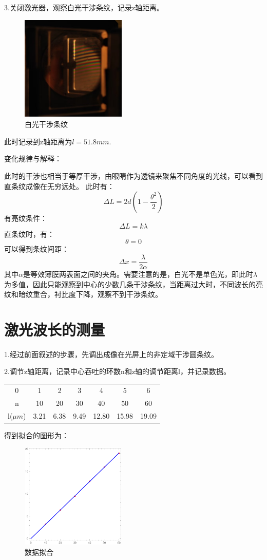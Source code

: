 \documentclass[a4paper, 10pt]{article}
\begin{document}
\noindent 3.关闭激光器，观察白光干涉条纹，记录z轴距离。

\begin{figure}[h]
  \centering 
  \includegraphics[height=5.0cm,width=5.0cm]{p7.png}
  
  \caption{白光干涉条纹}
  \label{8}

\end{figure}

\noindent 此时记录到z轴距离为$l=51.8mm$.

\noindent 变化规律与解释：

\noindent 此时的干涉也相当于等厚干涉，由眼睛作为透镜来聚焦不同角度的光线，可以看到直条纹成像在无穷远处。
此时有：
$$\Delta L=2d(1-\frac{\theta^2}{2})$$
有亮纹条件：
$$\Delta L=k\lambda$$
直条纹时，有：
$$\theta=0$$
可以得到条纹间距：
$$\Delta x=\frac{\lambda}{2\alpha}$$
其中$\alpha$是等效薄膜两表面之间的夹角。需要注意的是，白光不是单色光，即此时$\lambda$为多值，因此只能观察到中心的少数几条干涉条纹，当距离过大时，不同波长的亮纹和暗纹重合，衬比度下降，观察不到干涉条纹。

\section{激光波长的测量}
\noindent 1.经过前面叙述的步骤，先调出成像在光屏上的非定域干涉圆条纹。

\noindent 2.调节z轴距离，记录中心吞吐的环数n和z轴的调节距离l，并记录数据。

 \begin{tabular}{c|c|c|c|c|c|c}
 0 & 1 & 2 & 3 & 4 & 5 & 6 \\
 n & 10 & 20 & 30 & 40 & 50 & 60  \\
 l($\mu m$) & 3.21 & 6.38 & 9.49 & 12.80 & 15.98 & 19.09 \\
 \end{tabular}
得到拟合的图形为：
\begin{figure}[h]
  \centering 
  \includegraphics[height=5.0cm,width=5.0cm]{p8.png}
  
  \caption{数据拟合}
  \label{9}

\end{figure}
\end{document}
